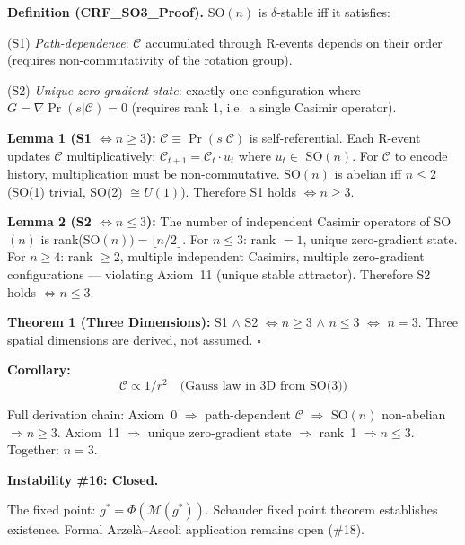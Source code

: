 \documentclass[12pt, a4paper]{article}
\begin{document}
\begin{derivedbox}[title={Theorem: $n = 3$ from $\delta$-Stability (CRF\_SO3\_Proof --- Closed)}]
\textbf{Definition (CRF\_SO3\_Proof).} SO$(n)$ is $\delta$-stable iff it satisfies:

(S1) \textit{Path-dependence}: $\mathcal{C}$ accumulated through R-events depends on their
order (requires non-commutativity of the rotation group).

(S2) \textit{Unique zero-gradient state}: exactly one configuration where $G = \nabla\Pr(s|\mathcal{C}) = 0$
(requires rank 1, i.e.\ a single Casimir operator).

\textbf{Lemma 1 (S1 $\Leftrightarrow n \geq 3$):} $\mathcal{C} \equiv \Pr(s|\mathcal{C})$
is self-referential. Each R-event updates $\mathcal{C}$ multiplicatively:
$\mathcal{C}_{t+1} = \mathcal{C}_t \cdot u_t$ where $u_t \in $ SO$(n)$. For $\mathcal{C}$
to encode history, multiplication must be non-commutative. SO$(n)$ is abelian iff
$n \leq 2$ (SO(1) trivial, SO(2) $\cong U(1)$). Therefore S1 holds $\Leftrightarrow n \geq 3$.

\textbf{Lemma 2 (S2 $\Leftrightarrow n \leq 3$):} The number of independent Casimir operators
of SO$(n)$ is rank(SO$(n)) = \lfloor n/2 \rfloor$. For $n \leq 3$: rank $= 1$, unique
zero-gradient state. For $n \geq 4$: rank $\geq 2$, multiple independent Casimirs, multiple
zero-gradient configurations --- violating Axiom~11 (unique stable attractor). Therefore
S2 holds $\Leftrightarrow n \leq 3$.

\textbf{Theorem 1 (Three Dimensions):}
S1 $\wedge$ S2 $\Leftrightarrow n \geq 3$ $\wedge$ $n \leq 3$ $\Leftrightarrow$ $n = 3$.
Three spatial dimensions are derived, not assumed. $\square$

\textbf{Corollary:}
\[
  \mathcal{C} \propto 1/r^2 \quad\text{(Gauss law in 3D from SO(3))}
\]

Full derivation chain: Axiom~0 $\Rightarrow$ path-dependent $\mathcal{C}$ $\Rightarrow$
SO$(n)$ non-abelian $\Rightarrow n \geq 3$. Axiom~11 $\Rightarrow$ unique zero-gradient
state $\Rightarrow$ rank~1 $\Rightarrow n \leq 3$. Together: $n = 3$.

\textbf{Instability \#16: Closed.}
\end{derivedbox}

The fixed point: $g^* = \Phi(\mathcal{M}(g^*))$. Schauder fixed point theorem establishes
existence. Formal Arzel\`{a}--Ascoli application remains open (\#18).

\end{document}
